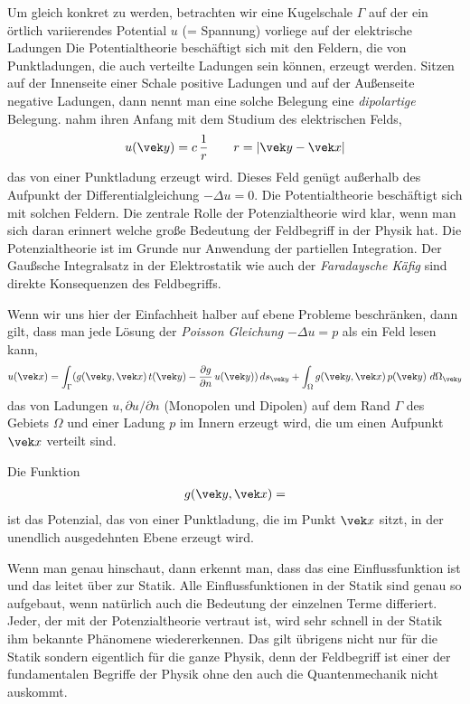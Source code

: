 {{Um gleich konkret zu werden, betrachten wir eine Kugelschale $\Gamma$ auf der ein \"{o}rtlich variierendes Potential $u$ (= Spannung) vorliege auf der elektrische Ladungen
Die Potentialtheorie besch\"{a}ftigt sich mit den Feldern, die von Punktladungen, die auch verteilte Ladungen sein k\"{o}nnen, erzeugt werden. Sitzen auf der Innenseite einer Schale positive Ladungen und auf der Au{\ss}enseite negative Ladungen, dann nennt man eine solche Belegung eine {\em dipolartige\/} Belegung. nahm ihren Anfang mit dem Studium des elektrischen Felds,
\begin{align}
u(\vek y) = c\,\frac{1}{r}  \qquad r = |\vek y - \vek x|
\end{align}
das von einer Punktladung erzeugt wird. Dieses Feld gen\"{u}gt au{\ss}erhalb des Aufpunkt der Differentialgleichung $- \Delta u = 0$. Die Potentialtheorie besch\"{a}ftigt sich mit solchen Feldern. Die zentrale Rolle der Potenzialtheorie wird klar, wenn man sich daran erinnert welche gro{\ss}e Bedeutung der Feldbegriff in der Physik hat. Die Potenzialtheorie ist im Grunde nur Anwendung der partiellen Integration. Der Gau{\ss}sche Integralsatz in der Elektrostatik wie auch der {\em Faradaysche K\"{a}fig\/} sind direkte Konsequenzen des Feldbegriffs.

Wenn wir uns hier der Einfachheit halber auf ebene Probleme beschr\"{a}nken, dann gilt, dass man jede L\"{o}sung der {\em Poisson Gleichung\/} $- \Delta u = p$ als ein Feld lesen kann,
\begin{align}
u(\vek x) = \int_{\Gamma} (g(\vek y, \vek x) \,t(\vek y) - \frac{\partial g}{\partial n}\,u(\vek y))\,ds_{\vek y} + \int_{\Omega} g(\vek y, \vek x)\,p(\vek y)\,\,d\Omega_{\vek y}
\end{align}
das von Ladungen $u, \partial u/ \partial n$ (Monopolen und Dipolen) auf dem Rand $\Gamma $ des Gebiets $\Omega$ und einer Ladung $p $ im Innern erzeugt wird, die um einen Aufpunkt $\vek x$ verteilt sind.

Die Funktion
\begin{align}
g(\vek y, \vek x) =
\end{align}
ist das Potenzial, das von einer Punktladung, die im Punkt $\vek x$ sitzt, in der unendlich ausgedehnten Ebene erzeugt wird.

Wenn man genau hinschaut, dann erkennt man, dass das eine Einflussfunktion ist und das leitet \"{u}ber zur Statik. Alle Einflussfunktionen in der Statik sind genau so aufgebaut, wenn nat\"{u}rlich auch die Bedeutung der einzelnen Terme differiert. Jeder, der mit der Potenzialtheorie vertraut ist, wird sehr schnell in der Statik ihm bekannte Ph\"{a}nomene wiedererkennen. Das gilt \"{u}brigens nicht nur f\"{u}r die Statik sondern eigentlich f\"{u}r die ganze Physik, denn der Feldbegriff ist einer der fundamentalen Begriffe der Physik ohne den auch die Quantenmechanik nicht auskommt.

}}
